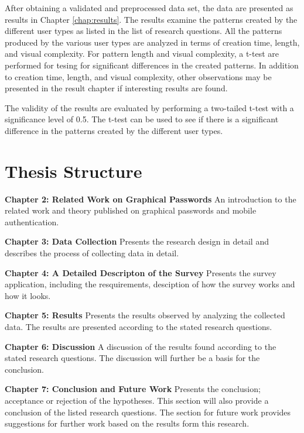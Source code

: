       After obtaining a validated and preprocessed data set, the data are presented as results in Chapter \ref{chap:results}. The results examine the patterns created by the different user types as listed in the list of research questions. All the patterns produced by the various user types are analyzed in terms of creation time, length, and visual complexity. For pattern length and visual complexity, a t-test are performed for tesing for significant differences in the created patterns. In addition to creation time, length, and visual complexity, other observations may be presented in the result chapter if interesting results are found. 

      The validity of the results are evaluated by performing a two-tailed t-test with a significance level of 0.5. The t-test can be used to see if there is a significant difference in the patterns created by the different user types.

  \clearpage
  \section{Thesis Structure} \label{sec:structure}

    {\bf Chapter 2: Related Work on Graphical Passwords}
    An introduction to the related work and theory published on graphical passwords and mobile authentication.

    {\bf Chapter 3: Data Collection}
    Presents the research design in detail and describes the process of collecting data in detail.

    {\bf Chapter 4: A Detailed Descripton of the Survey}
    Presents the survey application, including the resquirements, desciption of how the survey works and how it looks. 

    {\bf Chapter 5: Results}
    Presents the results observed by analyzing the collected data. The results are presented according to the stated research questions.

    {\bf Chapter 6: Discussion}
    A discussion of the results found according to the stated research questions. The discussion will further be a basis for the conclusion. 

    {\bf Chapter 7: Conclusion and Future Work}
    Presents the conclusion; acceptance or rejection of the hypotheses. This section will also provide a conclusion of the listed research questions. The section for future work provides suggestions for further work based on the results form this research. 